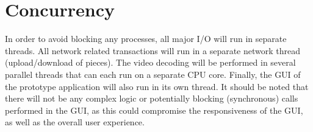 \section{Concurrency}
\label{sec:conc}
In order to avoid blocking any processes, all major I/O will run in separate threads. All network related transactions will run in a separate network thread (upload/download of pieces). The video decoding will be performed in several parallel threads that can each run on a separate CPU core. Finally, the GUI of the prototype application will also run in its own thread. It should be noted that there will not be any complex logic or potentially blocking (synchronous) calls performed in the GUI, as this could compromise the responsiveness of the GUI, as well as the overall user experience.